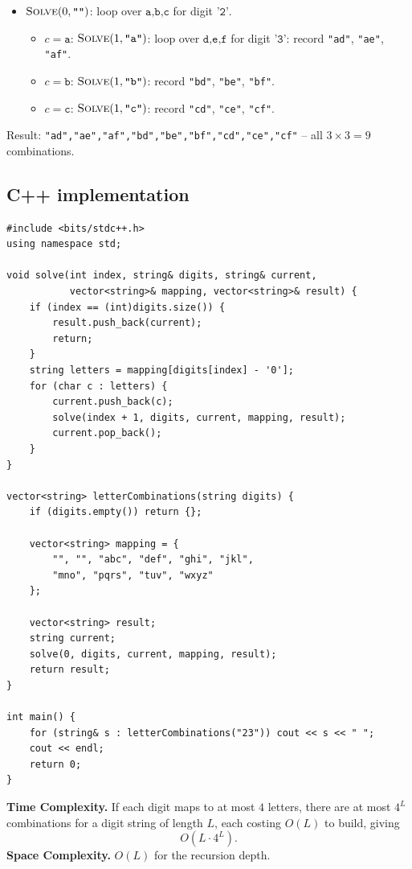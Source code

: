 \begin{itemize}
  \item $\textsc{Solve}(0,\texttt{""})$: loop over $\texttt{a,b,c}$ for
        digit $\texttt{'2'}$.
  \begin{itemize}
    \item $c=\texttt{a}$: $\textsc{Solve}(1,\texttt{"a"})$: loop over
          $\texttt{d,e,f}$ for digit $\texttt{'3'}$: record
          \texttt{"ad"}, \texttt{"ae"}, \texttt{"af"}.
    \item $c=\texttt{b}$: $\textsc{Solve}(1,\texttt{"b"})$: record
          \texttt{"bd"}, \texttt{"be"}, \texttt{"bf"}.
    \item $c=\texttt{c}$: $\textsc{Solve}(1,\texttt{"c"})$: record
          \texttt{"cd"}, \texttt{"ce"}, \texttt{"cf"}.
  \end{itemize}
\end{itemize}

Result: \texttt{"ad","ae","af","bd","be","bf","cd","ce","cf"} -- all
$3\times3=9$ combinations.

\subsection*{C++ implementation}

\begin{lstlisting}
#include <bits/stdc++.h>
using namespace std;

void solve(int index, string& digits, string& current,
           vector<string>& mapping, vector<string>& result) {
    if (index == (int)digits.size()) {
        result.push_back(current);
        return;
    }
    string letters = mapping[digits[index] - '0'];
    for (char c : letters) {
        current.push_back(c);
        solve(index + 1, digits, current, mapping, result);
        current.pop_back();
    }
}

vector<string> letterCombinations(string digits) {
    if (digits.empty()) return {};

    vector<string> mapping = {
        "", "", "abc", "def", "ghi", "jkl",
        "mno", "pqrs", "tuv", "wxyz"
    };

    vector<string> result;
    string current;
    solve(0, digits, current, mapping, result);
    return result;
}

int main() {
    for (string& s : letterCombinations("23")) cout << s << " ";
    cout << endl;
    return 0;
}
\end{lstlisting}

\begin{complexitybox}
\textbf{Time Complexity.} If each digit maps to at most $4$ letters,
there are at most $4^L$ combinations for a digit string of length $L$,
each costing $O(L)$ to build, giving
\[
  O(L \cdot 4^L).
\]
\textbf{Space Complexity.} $O(L)$ for the recursion depth.
\end{complexitybox}

